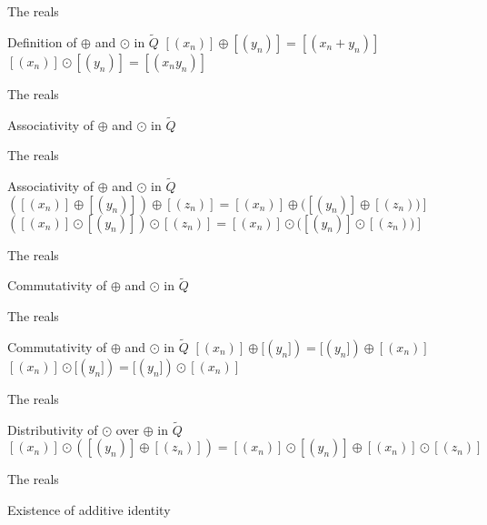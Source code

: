 \documentclass{beamer}
\begin{document}
\begin{frame}{The reals}
        \begin{block}{Definition of $\oplus$ and $\odot$ in $\widetilde{Q}$}
		$[(x_n)] \oplus [(y_n)] = [(x_n + y_n)]$\\
		$[(x_n)] \odot [(y_n)] = [(x_ny_n)]$
	\end{block}
\end{frame}


\begin{frame}{The reals}
        \begin{block}{Associativity of $\oplus$ and $\odot$ in $\widetilde{Q}$}
        \end{block}
\end{frame}

\begin{frame}{The reals}
        \begin{block}{Associativity of $\oplus$ and $\odot$ in $\widetilde{Q}$}
		$([(x_n)] \oplus [(y_n)]) \oplus [(z_n)] = [(x_n)] \oplus ([(y_n)] \oplus [(z_n))]$\\
		$([(x_n)] \odot [(y_n)]) \odot [(z_n)] = [(x_n)] \odot ([(y_n)] \odot [(z_n))]$
        \end{block}
\end{frame}

\begin{frame}{The reals}
        \begin{block}{Commutativity of $\oplus$ and $\odot$ in $\widetilde{Q}$}
        \end{block}
\end{frame}

\begin{frame}{The reals}
        \begin{block}{Commutativity of $\oplus$ and $\odot$ in $\widetilde{Q}$}
		$[(x_n)] \oplus [(y_n]) = [(y_n]) \oplus [(x_n)]$
		$[(x_n)] \odot [(y_n]) = [(y_n]) \odot [(x_n)]$
	\end{block}
\end{frame}

\begin{frame}{The reals}
        \begin{block}{Distributivity of $\odot$ over $\oplus$ in $\widetilde{Q}$}
                $[(x_n)] \odot ([(y_n)] \oplus [(z_n)]) = [(x_n)] \odot [(y_n)] \oplus [(x_n)] \odot [(z_n)]$
        \end{block}
\end{frame}

\begin{frame}{The reals}
	\begin{block}{Existence of additive identity}
        \end{block}
\end{frame}
\end{document}
